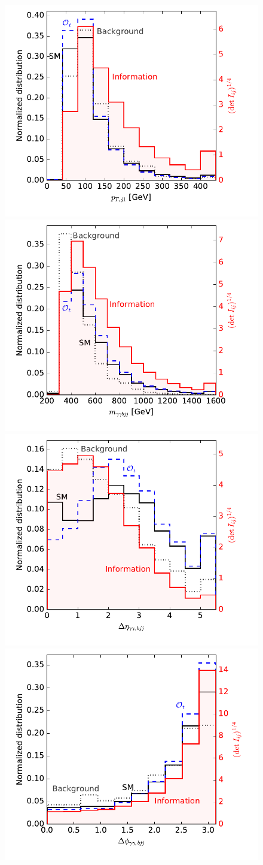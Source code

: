 \begin{figure}
  \includegraphics[width=0.49 \textwidth]{fig/information/th_information_over_ptj}%
  \includegraphics[width=0.49 \textwidth]{fig/information/th_information_over_maabjj}\\%
  \includegraphics[width=0.49 \textwidth]{fig/information/th_information_over_deltaeta}%
  \includegraphics[width=0.49 \textwidth]{fig/information/th_information_over_deltaphi}%

\end{figure}
